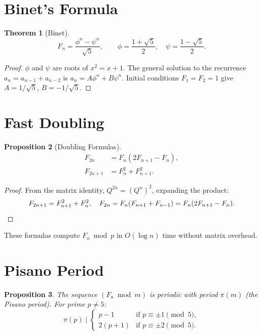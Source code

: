 \documentclass[11pt]{article}
\newtheorem{theorem}{Theorem}
\newtheorem{proposition}[theorem]{Proposition}
\begin{document}
\section{Binet's Formula}

\begin{theorem}[Binet]
\[
F_n = \frac{\phi^n - \psi^n}{\sqrt{5}}, \qquad \phi = \frac{1+\sqrt{5}}{2}, \quad \psi = \frac{1-\sqrt{5}}{2}.
\]
\end{theorem}

\begin{proof}
$\phi$ and $\psi$ are roots of $x^2 = x + 1$. The general solution to the recurrence $a_n = a_{n-1} + a_{n-2}$ is $a_n = A\phi^n + B\psi^n$. Initial conditions $F_1 = F_2 = 1$ give $A = 1/\sqrt{5}$, $B = -1/\sqrt{5}$.
\end{proof}

\section{Fast Doubling}

\begin{proposition}[Doubling Formulas]
\begin{align*}
F_{2n} &= F_n(2F_{n+1} - F_n), \\
F_{2n+1} &= F_n^2 + F_{n+1}^2.
\end{align*}
\end{proposition}

\begin{proof}
From the matrix identity, $Q^{2n} = (Q^n)^2$, expanding the product:
\[
F_{2n+1} = F_{n+1}^2 + F_n^2, \quad F_{2n} = F_n(F_{n+1} + F_{n-1}) = F_n(2F_{n+1} - F_n). \qedhere
\]
\end{proof}

These formulas compute $F_n \bmod p$ in $O(\log n)$ time without matrix overhead.

\section{Pisano Period}

\begin{proposition}
The sequence $(F_n \bmod m)$ is periodic with period $\pi(m)$ (the Pisano period). For prime $p \ne 5$:
\[
\pi(p) \mid \begin{cases} p - 1 & \text{if } p \equiv \pm 1 \pmod{5}, \\ 2(p+1) & \text{if } p \equiv \pm 2 \pmod{5}. \end{cases}
\]
\end{proposition}
\end{document}
